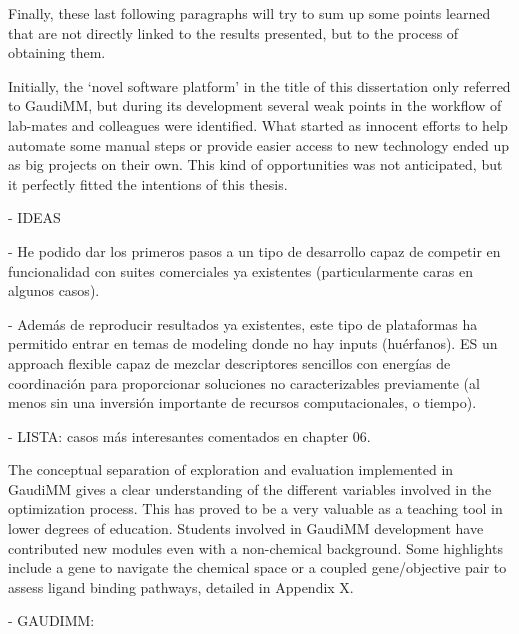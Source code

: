 
Finally, these last following paragraphs will try to sum up some points learned that are not directly linked to the results presented, but to the process of obtaining them.

Initially, the ‘novel software platform’ in the title of this dissertation only referred to GaudiMM, but during its development several weak points in the workflow of lab-mates and colleagues were identified. What started as innocent efforts to help automate some manual steps or provide easier access to new technology ended up as big projects on their own. This kind of opportunities was not anticipated, but it perfectly fitted the intentions of this thesis.

- IDEAS

	- He podido dar los primeros pasos a un tipo de desarrollo capaz de competir en funcionalidad con suites comerciales ya existentes (particularmente caras en algunos casos).

	- Además de reproducir resultados ya existentes, este tipo de plataformas ha permitido entrar en temas de modeling donde no hay inputs (huérfanos). ES un approach flexible capaz de mezclar descriptores sencillos con energías de coordinación para proporcionar soluciones no caracterizables previamente (al menos sin una inversión importante de recursos computacionales, o tiempo).

	- LISTA: casos más interesantes comentados en chapter 06.

	The conceptual separation of exploration and evaluation implemented in GaudiMM gives a clear understanding of the different variables involved in the optimization process. This has proved to be a very valuable as a teaching tool in lower degrees of education. Students involved in GaudiMM development have contributed new modules even with a non-chemical background. Some highlights include a gene to navigate the chemical space or a coupled gene/objective pair to assess ligand binding pathways, detailed in Appendix X.

- GAUDIMM:


